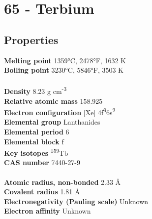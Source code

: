 \section{65 - Terbium}
\label{sec:elem-terbium}
\subsection{Properties}
\textbf{Melting point} 1359°C, 2478°F, 1632 K\\
\textbf{Boiling point} 3230°C, 5846°F, 3503 K\\
\\
\textbf{Density} 8.23 g cm\textsuperscript{-3}\\
\textbf{Relative atomic mass} 158.925\\
\textbf{Electron configuration} [Xe] 4f\textsuperscript{9}6s\textsuperscript{2}\\
\textbf{Elemental group} Lanthanides\\
\textbf{Elemental period} 6\\
\textbf{Elemental block} f\\
\textbf{Key isotopes} \textsuperscript{159}Tb\\
\textbf{CAS number} 7440-27-9\\
\\
\textbf{Atomic radius, non-bonded} 2.33 Å\\
\textbf{Covalent radius} 1.81 Å\\
\textbf{Electronegativity (Pauling scale)} Unknown\\
\textbf{Electron affinity} Unknown\\